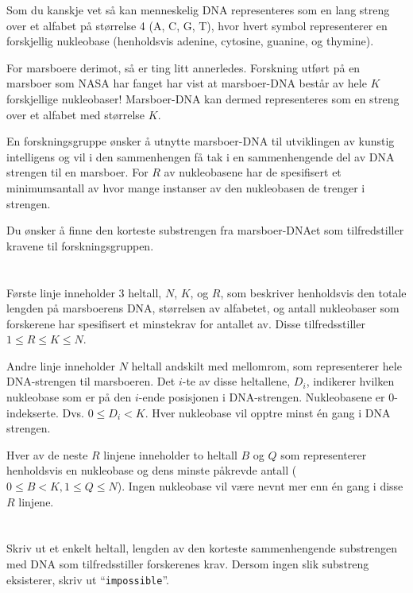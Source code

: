 \ifx\boi\undefined\fi
\def\version{jury-1}
Som du kanskje vet så kan menneskelig DNA representeres som en lang streng over et
alfabet på størrelse 4 ({A, C, G, T}), hvor hvert symbol representerer en forskjellig
nukleobase (henholdsvis adenine, cytosine, guanine, og thymine).

For marsboere derimot, så er ting litt annerledes. Forskning utført på en marsboer
som NASA har fanget har vist at marsboer-DNA består av hele $K$ forskjellige nukleobaser!
Marsboer-DNA kan dermed representeres som en streng over et alfabet med størrelse $K$.

En forskningsgruppe ønsker å utnytte marsboer-DNA til utviklingen av kunstig intelligens og
vil i den sammenhengen få tak i en sammenhengende del av DNA strengen til en marsboer. For
$R$ av nukleobasene har de spesifisert et minimumsantall av hvor mange instanser av den nukleobasen
de trenger i strengen.

Du ønsker å finne den korteste substrengen fra marsboer-DNAet som tilfredstiller kravene til forskningsgruppen.

\section*{}
Første linje inneholder 3 heltall, $N$, $K$, og $R$, som beskriver henholdsvis
den totale lengden på marsboerens DNA, størrelsen av alfabetet, og antall nukleobaser
som forskerene har spesifisert et minstekrav for antallet av. Disse tilfredsstiller 
$1 \le R \le K \le N$.

Andre linje inneholder $N$ heltall andskilt med mellomrom, som representerer hele DNA-strengen til marsboeren.
Det $i$-te av disse heltallene, $D_i$, indikerer hvilken nukleobase som er på den $i$-ende posisjonen i
DNA-strengen. Nukleobasene er $0$-indekserte. Dvs. $0 \leq D_i < K$. Hver nukleobase vil opptre minst
én gang i DNA strengen.

Hver av de neste $R$ linjene inneholder to heltall $B$ og $Q$ som representerer henholdsvis en nukleobase og dens
minste påkrevde antall ($0 \le B < K, 1 \le Q \le N$). Ingen nukleobase vil være nevnt mer enn én gang i disse $R$ linjene.

\section*{\outputsection}
Skriv ut et enkelt heltall, lengden av den korteste sammenhengende substrengen med DNA som tilfredsstiller forskerenes krav.
Dersom ingen slik substreng eksisterer, skriv ut ``\texttt{impossible}''.

